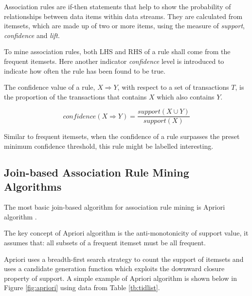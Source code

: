 \begin{definition}
\label{ar}
Association rules are if-then statements that help to show the probability of relationships between data items within data streams. They are calculated from itemsets, which are made up of two or more items, using the measure of \textit{support}, \textit{confidence} and \textit{lift}.
\end{definition}

To mine association rules, both LHS and RHS of a rule shall come from the frequent itemsets. Here another indicator \textit{confidence} level is introduced to indicate how often the rule has been found to be true.

The confidence value of a rule, $X \Rightarrow Y$, with respect to a set of transactions $T$, is the proportion of the transactions that contains $X$ which also contains $Y$.

\[confidence(X \Rightarrow Y) = \frac{support(X \cup Y)}{support(X)}\]

Similar to frequent itemsets, when the confidence of a rule surpasses the preset minimum confidence threshold, this rule might be labelled interesting.

\subsection{Join-based Association Rule Mining Algorithms}

The most basic join-based algorithm for association rule mining is Apriori algorithm \cite{apriori}. 

\begin{definition}
\label{Apriori}
The key concept of Apriori algorithm is the anti-monotonicity of support value, it assumes that: all subsets of a frequent itemset must be all frequent.
\end{definition}

Apriori uses a breadth-first search strategy to count the support of itemsets and uses a candidate generation function which exploits the downward closure property of support. A simple example of Apriori algorithm is shown below in Figure \ref{fig:apriori} using data from Table \ref{tb:tidlist}.

